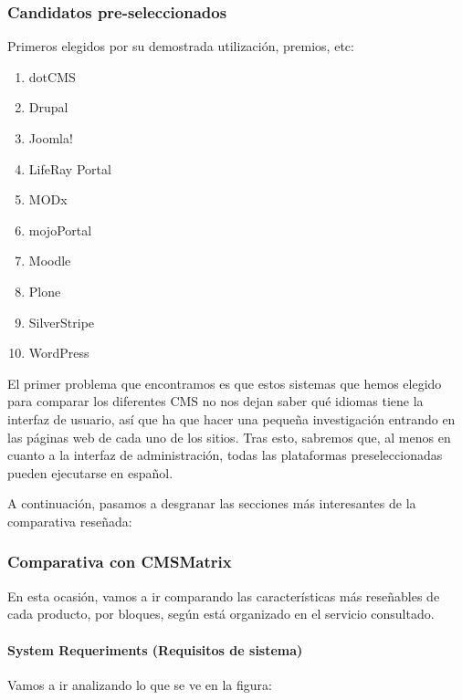 \subsubsection{Candidatos pre-seleccionados}
\par Primeros elegidos por su demostrada utilización, premios, etc:

\begin{enumerate}
\item dotCMS
\item Drupal
\item Joomla!
\item LifeRay Portal
\item MODx
\item mojoPortal
\item Moodle
\item Plone
\item SilverStripe
\item WordPress
\end{enumerate}

\par El primer problema que encontramos es que estos sistemas que hemos elegido para comparar los diferentes CMS no nos dejan saber qué idiomas tiene la interfaz de usuario, así que ha que hacer una pequeña investigación entrando en las páginas web de cada uno de los sitios. Tras esto, sabremos que, al menos en cuanto a la interfaz de administración, todas las plataformas preseleccionadas pueden ejecutarse en español.


\par A continuación, pasamos a desgranar las secciones más interesantes de la comparativa reseñada:

\subsubsection{Comparativa con CMSMatrix}

\par En esta ocasión, vamos a ir comparando las características más reseñables de cada producto, por bloques, según está organizado en el servicio consultado.

\paragraph{System Requeriments (Requisitos de sistema)}

\par Vamos a ir analizando lo que se ve en la figura:

